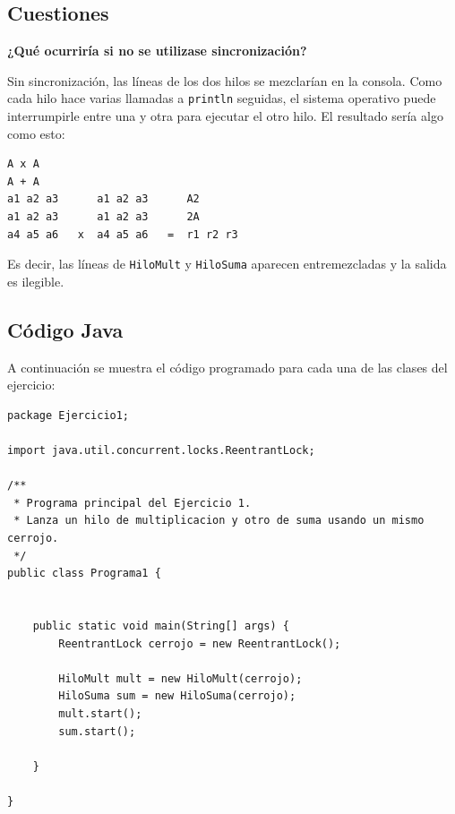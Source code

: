 \documentclass[12pt,a4paper]{article}
\begin{document}
\newpage


\subsection{Cuestiones}

\textbf{¿Qué ocurriría si no se utilizase sincronización?}

Sin sincronización, las líneas de los dos hilos se mezclarían en la consola. Como cada hilo hace varias llamadas a \texttt{println} seguidas, el sistema operativo puede interrumpirle entre una y otra para ejecutar el otro hilo. El resultado sería algo como esto:

\begin{lstlisting}[language={}, frame=leftline, basicstyle=\ttfamily\small, caption={Ejemplo de salida intercalada (sin cerrojo)}]
A x A
A + A
a1 a2 a3      a1 a2 a3      A2
a1 a2 a3      a1 a2 a3      2A 
a4 a5 a6   x  a4 a5 a6   =  r1 r2 r3
\end{lstlisting}

Es decir, las líneas de \texttt{HiloMult} y \texttt{HiloSuma} aparecen entremezcladas y la salida es ilegible.

\subsection{Código Java}

A continuación se muestra el código programado para cada una de las clases del ejercicio:

\begin{lstlisting}[caption={Programa1.java}]
package Ejercicio1;

import java.util.concurrent.locks.ReentrantLock;

/**
 * Programa principal del Ejercicio 1.
 * Lanza un hilo de multiplicacion y otro de suma usando un mismo cerrojo.
 */
public class Programa1 {


	public static void main(String[] args) {
		ReentrantLock cerrojo = new ReentrantLock();
		
		HiloMult mult = new HiloMult(cerrojo);
		HiloSuma sum = new HiloSuma(cerrojo);
		mult.start();
		sum.start();
		
	}

}

\end{lstlisting}
\end{document}
